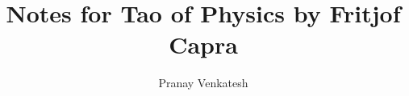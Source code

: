 \documentclass{article}
\title{Notes for Tao of Physics by Fritjof Capra}
\author{Pranay Venkatesh}
\date{}
\begin{document}
\begin{titlepage}
\maketitle
\end{titlepage}
\end{document}
